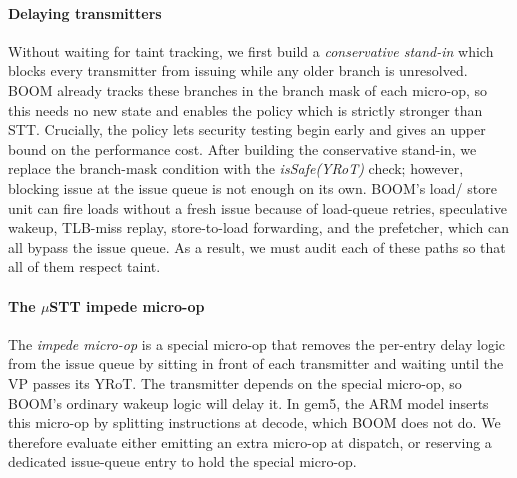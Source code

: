 
\paragraph{Delaying transmitters}
Without waiting for taint tracking, we first build a \emph{conservative stand-in}
which blocks every transmitter from issuing while any older branch is unresolved.
BOOM already tracks these branches in the branch mask of each micro-op, so this needs no new 
state and enables the policy which is strictly stronger than STT. Crucially, the policy lets 
security testing begin early and gives an upper bound on the performance cost. After building the 
conservative stand-in, we replace the branch-mask condition with the \textit{isSafe(YRoT)} 
check; however, blocking issue at the issue queue is not enough on its own. BOOM's load/\allowbreak 
store unit can fire loads without a fresh issue because of load-queue retries, speculative wakeup, 
TLB-miss replay, store-to-load forwarding, and the prefetcher, which can all bypass the issue
queue. As a result, we must audit each of these paths so that all of them respect taint.

\paragraph{The $\mu$STT impede micro-op}
The \emph{impede micro-op} is a special 
micro-op that removes the per-entry delay logic from the issue queue by sitting in front of each transmitter 
and waiting until the VP passes its YRoT. The transmitter depends on the special 
micro-op, so BOOM's ordinary wakeup logic will delay it. In gem5, the ARM model inserts 
this micro-op by splitting instructions at decode, which BOOM does not do. We therefore evaluate 
either emitting an extra micro-op at dispatch, or reserving a dedicated issue-queue entry to hold 
the special micro-op.
